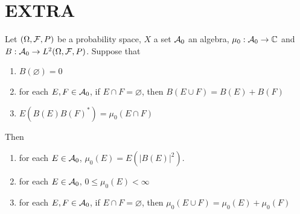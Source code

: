 \documentclass{book}
\begin{document}
	
	
	
	
	
	
	
	
	
	
	
	
	
	
	
	
	
	
	
	
	
	
	
	
	
	
	
	
	
	
	
	
	
	
	
	
	
	
	
	
	\newpage
	\section{EXTRA}
	\begin{ex}
	Let $(\Omega, \mathcal{F}, P)$ be a probability space, $X$ a set $\mathcal{A}_0$ an algebra, $\mu_0:\mathcal{A}_0 \rightarrow \mathbb{C}$ and $B:\mathcal{A}_0 \rightarrow L^2(\Omega, \mathcal{F}, P)$. 
	Suppose that 
	\begin{enumerate}
	\item $B(\varnothing) = 0$
	\item for each $E, F \in \mathcal{A}_0$, if $E \cap F = \varnothing$, then $B(E \cup F) = B(E) + B(F)$
	\item $E(B(E)B(F)^*) = \mu_0(E \cap F)$
	\end{enumerate}
	Then 
	\begin{enumerate}
	\item for each $E \in \mathcal{A}_0$, $\mu_0(E) = E(|B(E)|^2)$.
	\item for each $E \in \mathcal{A}_0$, $0 \leq \mu_0(E) < \infty$ 
	\item for each $E, F \in \mathcal{A}_0$, if $E \cap F = \varnothing$, then $\mu_0(E \cup F) = \mu_0(E) + \mu_0(F)$
	\end{enumerate}
	\end{ex}
	
\end{document}
